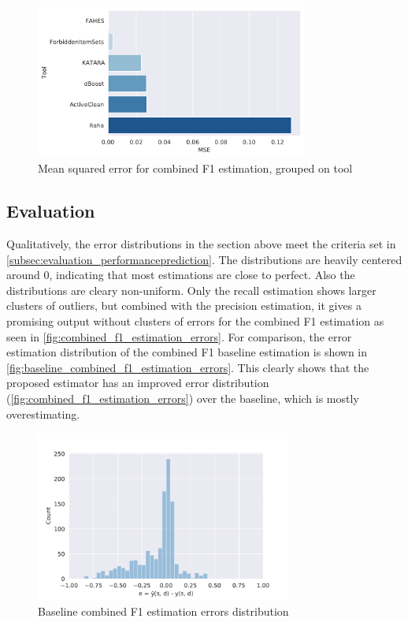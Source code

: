 \begin{figure}[H]
    \centering
    \includegraphics[width=0.8\textwidth]{thesis/Figures/RQ2/15_tools_combined_f1.pdf}
    \caption{Mean squared error for combined F1 estimation, grouped on tool}
    \label{fig:mse_combined_f1_tool}
\end{figure}


\subsection{Evaluation}
Qualitatively, the error distributions in the section above meet the criteria set in \autoref{subsec:evaluation_performanceprediction}. The distributions are heavily centered around 0, indicating that most estimations are close to perfect. Also the distributions are cleary non-uniform. Only the recall estimation shows larger clusters of outliers, but combined with the precision estimation, it gives a promising output without clusters of errors for the combined F1 estimation as seen in \autoref{fig:combined_f1_estimation_errors}. For comparison, the error estimation distribution of the combined F1 baseline estimation is shown in \autoref{fig:baseline_combined_f1_estimation_errors}. This clearly shows that the proposed estimator has an improved error distribution (\autoref{fig:combined_f1_estimation_errors}) over the baseline, which is mostly overestimating. 

\begin{figure}[h]
    \centering
    \includegraphics[width=0.75\textwidth]{thesis/Figures/RQ2/15_average_estimator_error_histogramcell_f1_combined.pdf}
    \caption{Baseline combined F1 estimation errors distribution}
    \label{fig:baseline_combined_f1_estimation_errors}
\end{figure}

